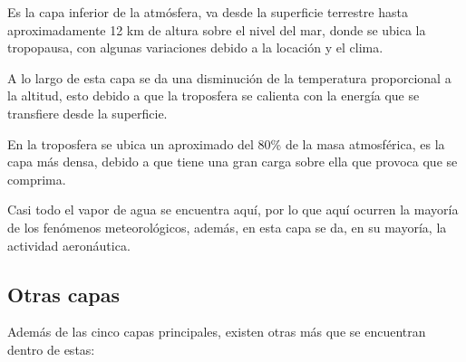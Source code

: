 \documentclass{article}
\begin{document}
Es la capa inferior de la atmósfera, va desde la superficie terrestre hasta aproximadamente 12 km de altura sobre el nivel del mar, donde se ubica la tropopausa, con algunas variaciones debido a la locación y el clima. 

A lo largo de esta capa se da una disminución de la temperatura proporcional a la altitud, esto debido a que la troposfera se calienta con la energía que se transfiere desde la superficie. 

En la troposfera se ubica un aproximado del 80\% de la masa atmosférica, es la capa más densa, debido a que tiene una gran carga sobre ella que provoca que se comprima.

Casi todo el vapor de agua se encuentra aquí, por lo que aquí ocurren la mayoría de los fenómenos meteorológicos, además, en esta capa se da, en su mayoría, la actividad aeronáutica.


\subsection {Otras capas}

Además de las cinco capas principales, existen otras más que se encuentran dentro de estas: 
\end{document}
